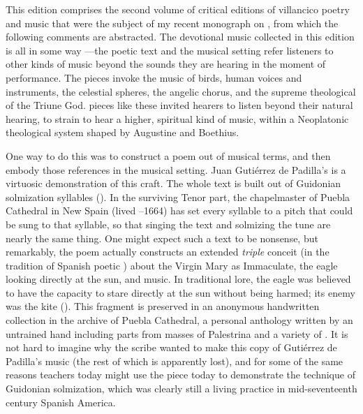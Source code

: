 This edition comprises the second volume of critical editions of villancico
poetry and music that were the subject of my recent monograph on , from which the following comments are
abstracted.%
    \Autocites
    {Cashner:WLSCM32}
    {Cashner:HearingFaith}
The devotional music collected in this edition is all in some way
---the poetic text and the musical setting refer
listeners to other kinds of music beyond the sounds they are hearing in the
moment of performance.
The pieces invoke the music of birds, human voices and instruments, the
celestial spheres, the angelic chorus, and the supreme theological
 of the Triune God.
 pieces like these invited hearers to listen beyond their
natural hearing, to strain to hear a higher, spiritual kind of music, within a
Neoplatonic theological system shaped by Augustine and Boethius.

One way to do this was to construct a poem out of musical terms, and then
embody those references in the musical setting.
Juan Gutiérrez de Padilla's  is a
virtuosic demonstration of this craft.
The whole text is built out of Guidonian solmization syllables ().
In the surviving Tenor part, the chapelmaster of Puebla Cathedral in New Spain
(lived --1664) has set every syllable to a pitch that could be
sung to that syllable, so that singing the text and solmizing the tune are
nearly the same thing.
One might expect such a text to be nonsense, but remarkably, the poem actually
constructs an extended \emph{triple} conceit (in the tradition of Spanish poetic
) about the Virgin Mary as Immaculate, the eagle looking 
directly at the sun, and music.
In traditional lore, the eagle was believed to have the capacity to stare
directly at the sun without being harmed; its enemy was the kite
().%
    \Autocite[]{Covarrubias:Tesoro}
This fragment is preserved in an anonymous handwritten collection in the
archive of Puebla Cathedral, a personal anthology written by an untrained hand
including parts from masses of Palestrina and a variety of .
It is not hard to imagine why the scribe wanted to make this copy of Gutiérrez
de Padilla's music (the rest of which is apparently lost), and for some of the
same reasons teachers today might use the piece today to demonstrate the
technique of Guidonian solmization, which was clearly still a living practice
in mid-seventeenth century Spanish America.

